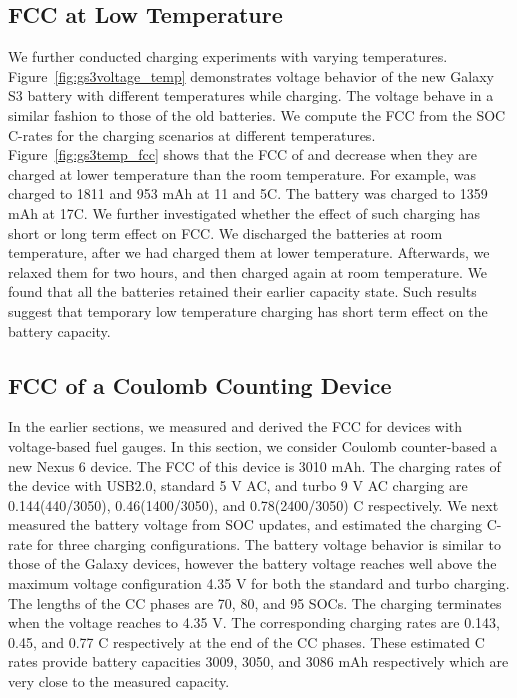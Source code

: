 \documentclass[journal]{IEEEtran}
\begin{document}
\subsection{FCC at Low Temperature}
\label{subsec:battemp}
We further conducted charging experiments with varying temperatures. Figure~\ref{fig:gs3voltage_temp} demonstrates voltage behavior of the new Galaxy S3 battery with different temperatures while charging. The voltage behave in a similar fashion to those of the old batteries. We compute the FCC from the SOC C-rates for the charging scenarios at different temperatures. Figure~\ref{fig:gs3temp_fcc} shows that the FCC of  and  decrease when they are charged at lower temperature than the room temperature. For example,  was charged to 1811 and 953 mAh at 11 and 5C. The battery  was charged to 1359 mAh at 17C. We further investigated whether the effect of such charging has short or long term effect on FCC. We discharged the batteries at room temperature, after we had charged them at lower temperature. Afterwards, we relaxed them for two hours, and then charged again at room temperature. We found that all the  batteries retained their earlier capacity state.  Such results suggest that temporary low temperature charging has short term effect on the battery capacity.


\subsection{FCC of a Coulomb Counting Device}
In the earlier sections, we measured and derived the FCC for devices with voltage-based fuel gauges. In this section, we consider Coulomb counter-based a new Nexus 6 device. The FCC of this device is 3010 mAh. The charging rates of the device with USB2.0, standard 5 V AC, and turbo 9 V AC charging are 0.144(440/3050), 0.46(1400/3050), and 0.78(2400/3050) C respectively. We next measured the battery voltage from SOC updates, and estimated the charging C-rate for three charging configurations. The battery voltage behavior is similar to those of the Galaxy devices, however the battery voltage reaches well above the maximum voltage configuration 4.35 V for both the standard and turbo charging. The lengths of the CC phases are 70, 80, and 95 SOCs. The charging terminates when the voltage reaches to 4.35 V. The corresponding charging rates are 0.143, 0.45, and 0.77 C respectively at the end of the CC phases. These estimated C rates provide battery capacities  3009, 3050, and 3086 mAh respectively which are very close to the measured capacity. 
\end{document}
